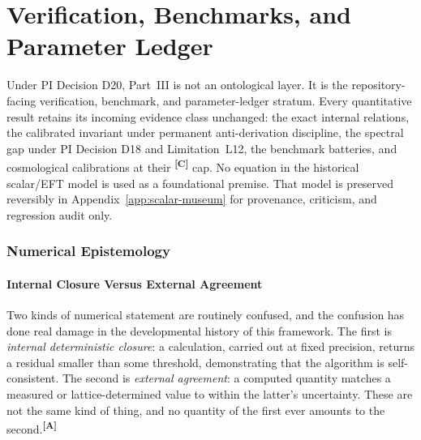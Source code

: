 \documentclass[12pt,a4paper,twoside]{article}
\theoremstyle{plain}
\theoremstyle{definition}
\theoremstyle{remark}
\newcommand{\catmark}[1]{\textsuperscript{\textsf{\textbf{[#1]}}}}
\begin{document}


\newpage
\part{Verification, Benchmarks, and Parameter Ledger}
\label{part:effective-field}

\noindent Under PI Decision D20, Part~III is not an ontological layer. It is
the repository-facing verification, benchmark, and parameter-ledger stratum.
Every quantitative result retains its incoming evidence class unchanged: the
exact internal relations, the calibrated invariant under permanent
anti-derivation discipline, the spectral gap under PI Decision D18 and
Limitation~L12, the benchmark batteries, and cosmological calibrations at
their \catmark{C} cap. No equation in the historical scalar/EFT model is used
as a foundational premise. That model is preserved reversibly in
Appendix~\ref{app:scalar-museum} for provenance, criticism, and regression
audit only.



\section{Numerical Epistemology}
\label{sec:numerical-epistemology}

\subsection{Internal Closure Versus External Agreement}
\label{subsec:closure-vs-agreement}

Two kinds of numerical statement are routinely confused, and the
confusion has done real damage in the developmental history of this
framework. The first is \emph{internal deterministic closure}: a
calculation, carried out at fixed precision, returns a residual smaller
than some threshold, demonstrating that the algorithm is
self-consistent. The second is \emph{external agreement}: a computed
quantity matches a measured or lattice-determined value to within the
latter's uncertainty. These are not the same kind of thing, and no
quantity of the first ever amounts to the second.\catmark{A}
\end{document}
